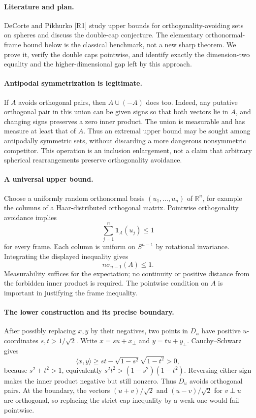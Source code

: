 \documentclass[11pt,a4paper]{article}
\begin{document}
\paragraph{Literature and plan.}
DeCorte and Pikhurko [R1] study upper bounds for orthogonality-avoiding
sets on spheres and discuss the double-cap conjecture. The elementary
orthonormal-frame bound below is the classical benchmark, not a new
sharp theorem. We prove it, verify the double caps pointwise, and
identify exactly the dimension-two equality and the higher-dimensional
gap left by this approach.

\paragraph{Antipodal symmetrization is legitimate.}
If $A$ avoids orthogonal pairs, then $A\cup(-A)$ does too. Indeed,
any putative orthogonal pair in this union can be given signs so that
both vectors lie in $A$, and changing signs preserves a zero inner
product. The union is measurable and has measure at least that of
$A$. Thus an extremal upper bound may be sought among antipodally
symmetric sets, without discarding a more dangerous nonsymmetric
competitor. This operation is an inclusion enlargement, not a claim
that arbitrary spherical rearrangements preserve orthogonality avoidance.

\paragraph{A universal upper bound.}
Choose a uniformly random orthonormal basis $(u_1,\ldots,u_n)$ of
$\mathbb R^n$, for example the columns of a Haar-distributed orthogonal
matrix. Pointwise orthogonality avoidance implies
\[
 \sum_{j=1}^n\mathbf1_A(u_j)\le1
\]
for every frame. Each column is uniform on $S^{n-1}$ by rotational
invariance. Integrating the displayed inequality gives
\[
 n\sigma_{n-1}(A)\le1.
\]
Measurability suffices for the expectation; no continuity or positive
distance from the forbidden inner product is required. The pointwise
condition on $A$ is important in justifying the frame inequality.

\paragraph{The lower construction and its precise boundary.}
After possibly replacing $x,y$ by their negatives, two points in
$D_u$ have positive $u$-coordinates $s,t>1/\sqrt2$. Write
$x=su+x_\perp$ and $y=tu+y_\perp$. Cauchy--Schwarz gives
\[
 \langle x,y\rangle\ge st-\sqrt{1-s^2}\sqrt{1-t^2}>0,
\]
because $s^2+t^2>1$, equivalently
$s^2t^2>(1-s^2)(1-t^2)$. Reversing either sign makes the inner
product negative but still nonzero. Thus $D_u$ avoids orthogonal
pairs. At the boundary, the vectors $(u+v)/\sqrt2$ and
$(u-v)/\sqrt2$ for $v\perp u$ are orthogonal, so replacing the
strict cap inequality by a weak one would fail pointwise.
\end{document}
